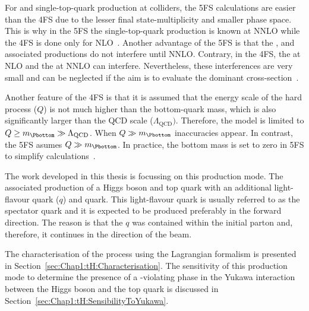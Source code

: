 For \tHq and single-top-quark production at colliders, the 5FS calculations are easier 
than the 4FS due to the lesser final state-multiplicity and smaller phase space. 
This is why in the 5FS the single-top-quark production
is known at NNLO while the 4FS is done only for NLO~\cite{Demartin:2015uha}. Another advantage of 
the 5FS is that the \tchannel, \schannel and associated \tWH productions 
do not interfere until NNLO. Contrary, in the 4FS, the
\tchannel at NLO and the \schannel at NNLO can interfere. 
Nevertheless, these interferences are very small and can be neglected if the aim is to evaluate 
the dominant \tchannel cross-section~\cite{Demartin:2015uha}.

Another feature of the 4FS is that it is assumed that the energy scale
of the hard process ($Q$) is not much higher than the bottom-quark
mass, which is also significantly larger than the QCD scale ($\Lambda_{\text{QCD}})$.
Therefore, the model is limited to $Q \geq m_{\Pbottom} \gg \Lambda_{\text{QCD}}$.
When $Q \gg m_{\Pbottom}$ inaccuracies appear. 
In contrast, the 5FS asumes $Q \gg m_{\Pbottom}$. In practice, the bottom mass
is set to zero in 5FS to simplify calculations~\cite{Demartin:2015uha}.

The work developed in this thesis is focussing on this production mode.
The associated production of a Higgs boson and top quark with an additional
light-flavour quark ($q$) and \Pbottom quark. This light-flavour quark 
is usually referred to as the spectator quark and it is expected to
be produced preferably in the forward direction.
The reason %
is that the $q$ was contained within the initial parton
and, therefore, it continues in the direction of the beam. %

The characterisation of the \tHq process using the Lagrangian formalism is
presented in Section~\ref{sec:Chap1:tH:Characterisation}. The
sensitivity of this production mode to determine the presence
of a \CP-violating phase in the Yukawa interaction between the 
Higgs boson and the top quark is discussed in Section~\ref{sec:Chap1:tH:SensibilityToYukawa}.

